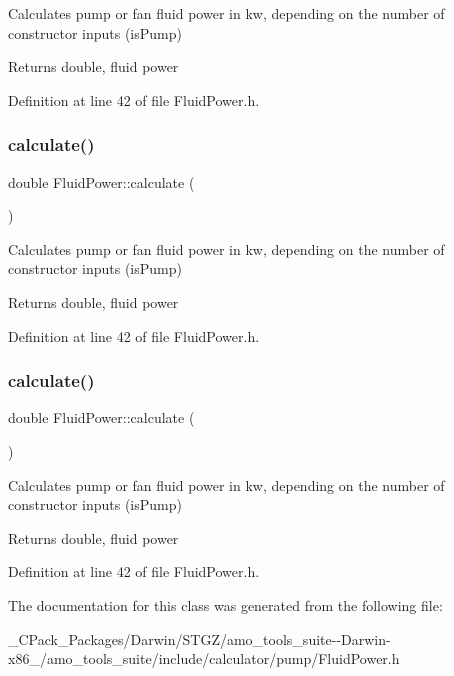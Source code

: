 Calculates pump or fan fluid power in kw, depending on the number of constructor inputs (is\+Pump) \begin{DoxyReturn}{Returns}
double, fluid power 
\end{DoxyReturn}


Definition at line 42 of file Fluid\+Power.\+h.

\mbox{\label{class_fluid_power_a2691f6efdbd5e71aa91e087c6b1c197b}} 
\subsubsection{\texorpdfstring{calculate()}{calculate()}\hspace{0.1cm}{\footnotesize\ttfamily [2/3]}}
{\footnotesize\ttfamily double Fluid\+Power\+::calculate (\begin{DoxyParamCaption}{ }\end{DoxyParamCaption})\hspace{0.3cm}{\ttfamily [inline]}}

Calculates pump or fan fluid power in kw, depending on the number of constructor inputs (is\+Pump) \begin{DoxyReturn}{Returns}
double, fluid power 
\end{DoxyReturn}


Definition at line 42 of file Fluid\+Power.\+h.

\mbox{\label{class_fluid_power_a2691f6efdbd5e71aa91e087c6b1c197b}} 
\subsubsection{\texorpdfstring{calculate()}{calculate()}\hspace{0.1cm}{\footnotesize\ttfamily [3/3]}}
{\footnotesize\ttfamily double Fluid\+Power\+::calculate (\begin{DoxyParamCaption}{ }\end{DoxyParamCaption})\hspace{0.3cm}{\ttfamily [inline]}}

Calculates pump or fan fluid power in kw, depending on the number of constructor inputs (is\+Pump) \begin{DoxyReturn}{Returns}
double, fluid power 
\end{DoxyReturn}


Definition at line 42 of file Fluid\+Power.\+h.



The documentation for this class was generated from the following file\+:\begin{DoxyCompactItemize}
\item 
\+\_\+\+C\+Pack\+\_\+\+Packages/\+Darwin/\+S\+T\+G\+Z/amo\+\_\+tools\+\_\+suite-\/-\/\+Darwin-\/x86\+\_/amo\+\_\+tools\+\_\+suite/include/calculator/pump/Fluid\+Power.\+h\end{DoxyCompactItemize}
